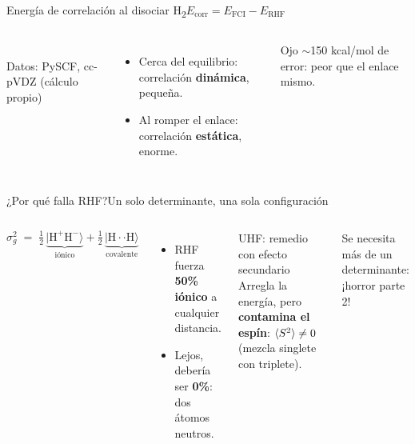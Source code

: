 \documentclass[aspectratio=169]{beamer}
\newcommand{\cplx}[1]{{\footnotesize\color{cookieMuted}#1}}
\newcommand{\src}[1]{{\tiny\color{cookieMuted}#1}}
\begin{document}
\begin{frame}{Energía de correlación al disociar H\textsubscript{2}}{$E_\mathrm{corr}=E_\mathrm{FCI}-E_\mathrm{RHF}$}
  \begin{columns}[T,onlytextwidth]
      \\
      \src{Datos: PySCF, cc-pVDZ (cálculo propio)}
      \begin{itemize}\setlength\itemsep{4pt}
        \item Cerca del equilibrio: correlación \textbf{dinámica}, pequeña.
        \item Al romper el enlace: correlación \textbf{estática}, enorme.
      \end{itemize}
      \begin{alertblock}{Ojo}
        $\sim$150 kcal/mol de error: peor que el enlace mismo.
      \end{alertblock}
  \end{columns}
\end{frame}

\begin{frame}{¿Por qué falla RHF?}{Un solo determinante, una sola configuración}
  \begin{columns}[T,onlytextwidth]
      \[ \sigma_g^{2}\;=\;\tfrac12\,\underbrace{|\mathrm{H^+H^-}\rangle}_{\text{iónico}}+\tfrac12\,\underbrace{|\mathrm{H{\cdot}{\cdot}H}\rangle}_{\text{covalente}} \]
      \begin{itemize}\setlength\itemsep{4pt}
        \item RHF fuerza \textbf{50\% iónico} a cualquier distancia.
        \item Lejos, debería ser \textbf{0\%}: dos átomos neutros.
      \end{itemize}
      \begin{alertblock}{UHF: remedio con efecto secundario}
        Arregla la energía, pero \textbf{contamina el espín}: $\braket{S^2}\neq0$ (mezcla singlete con triplete).
      \end{alertblock}
      \cplx{Se necesita más de un determinante: ¡horror parte 2!}
  \end{columns}
\end{frame}
\end{document}
